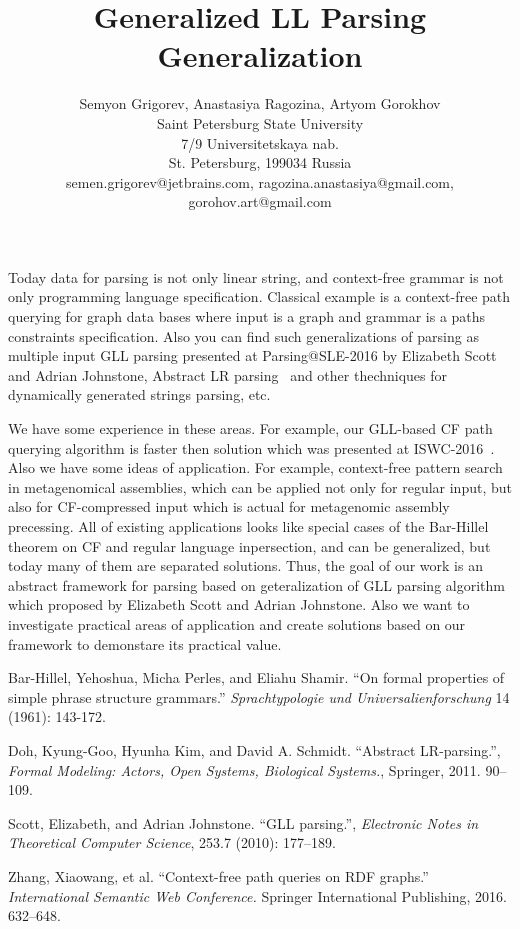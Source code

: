\documentclass[12pt]{article}  %
\title{Generalized LL Parsing Generalization}
\author{Semyon Grigorev, Anastasiya Ragozina, Artyom Gorokhov
\\
       {Saint Petersburg State University}\\
       {7/9 Universitetskaya nab.}\\
       {St. Petersburg, 199034 Russia}\\
       semen.grigorev@jetbrains.com, ragozina.anastasiya@gmail.com, 
       \\ gorohov.art@gmail.com
       }
\date{}
\theoremstyle{definition}
\theoremstyle{remark}
\begin{document}
\maketitle

Today data for parsing is not only linear string, and context-free grammar is not only programming language specification.
Classical example is a context-free path querying for graph data bases where input is a graph and grammar is a paths constraints specification.
Also you can find such generalizations of parsing as multiple input GLL parsing presented at Parsing@SLE-2016 by Elizabeth Scott and Adrian Johnstone, 
Abstract LR parsing~\cite{AbstractParsing} and other thechniques for dynamically generated strings parsing, etc.

We have some experience in these areas.
For example, our GLL-based CF path querying algorithm is faster then solution which was presented at ISWC-2016~\cite{CFRDFParsing}. 
Also we have some ideas of application.
For example, context-free pattern search in metagenomical assemblies, which can be applied not only for regular input, but also for CF-compressed input which is actual for metagenomic assembly precessing. 
All of existing applications looks like special cases of the Bar-Hillel~\cite{Bar-Hillel} theorem on CF and regular language inpersection, and can be generalized, but today many of them are separated solutions.
Thus, the goal of our work is an abstract framework for parsing based on geteralization of GLL parsing algorithm~\cite{GLL} which proposed by Elizabeth Scott and Adrian Johnstone. 
Also we want to investigate practical areas of application and create solutions based on our framework to demonstare its practical value.

\begin{thebibliography}{9}

  Bar-Hillel, Yehoshua, Micha Perles, and Eliahu Shamir.
  ``On formal properties of simple phrase structure grammars.''
   \emph{Sprachtypologie und Universalienforschung}
   14 (1961): 143-172.

  Doh, Kyung-Goo, Hyunha Kim, and David A. Schmidt.
  ``Abstract LR-parsing.'',
  \emph{Formal Modeling: Actors, Open Systems, Biological Systems.},
  Springer,
  2011.
  90--109.

  Scott, Elizabeth, and Adrian Johnstone.   
  ``GLL parsing.'',
  \emph{Electronic Notes in Theoretical Computer Science},
  253.7 (2010): 177--189.

  Zhang, Xiaowang, et al.
  ``Context-free path queries on RDF graphs.'' 
  \emph{International Semantic Web Conference.}
   Springer International Publishing, 2016.
   632--648.

\end{thebibliography}
\end{document}
